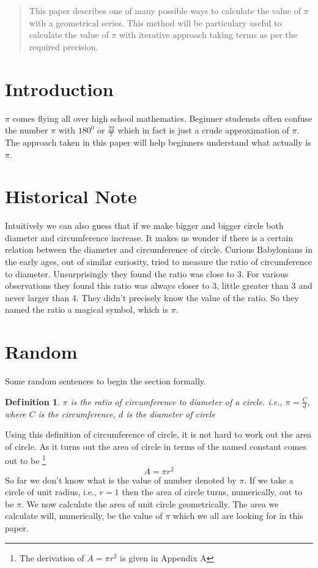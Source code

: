 \documentclass{jpconf}
\theoremstyle{definition} \newtheorem{Definition}{Def{\,}inition}
\begin{document}
	\stConfTitle 
\begin{abstract}
This paper describes one of many possible ways to calculate the value of $\pi$ with a geometrical series. This method will be particulary useful to calculate the value of $\pi$ with iterative approach taking terms as per the required precision.
\end{abstract}


\section{Introduction}
$\pi$ comes flying all over high school mathematics. Beginner studensts often confuse the number $\pi$ with $180^0$ or $\frac{22}{7}$ which in fact is just a crude approximation of $\pi$. The approach taken in this paper will help beginners understand what actually is $\pi$.


\section{Historical Note}
Intuitively we can also guess that if we make bigger and bigger circle both diameter and circumference increase. It makes us wonder if there is a certain relation between the diameter and circumference of circle. Curious Babylonians in the early ages, out of similar curiosity, tried to measure the ratio of circumference to diameter. Unsurprisingly they found the ratio was close to $3$. For various observations they found this ratio was always closer to 3, little greater than 3 and never larger than 4. They didn't precisely know the value of the ratio. So they named the ratio a magical symbol, which is $\pi$.
\section{Random }
Some random sentences to begin the section formally.
\begin{Definition}
	\emph{ $\pi$ is the ratio of circumference to diameter of a circle. i.e., $\pi = \frac{C}{d}$, where $C$ is the circumference, $d$ is the diameter of circle}
\end{Definition}
Using this definition of circumference of circle, it is not hard to work out the area of circle. As it turns out the area of circle in terms of the named constant comes out to be \footnote{The derivation of $A = \pi r^2$ is given in Appendix A}\[ A = \pi r^2 \]
So far we don't know what is the value of number denoted by $\pi$. If we take a circle of unit radius, i.e., $r = 1$ then the area of circle turns, numerically, out to be $\pi$. We now calculate the area of unit circle geometrically. The area we calculate will, numerically, be the value of $\pi$ which we all are looking for in this paper.
			
\end{document}
